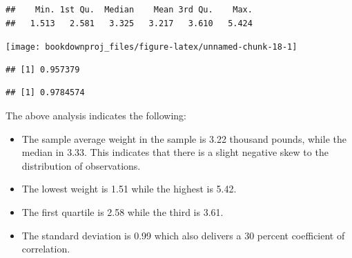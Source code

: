 \documentclass[
]{book}
\newenvironment{Shaded}{\begin{snugshade}}{\end{snugshade}}
\newcommand{\AttributeTok}[1]{\textcolor[rgb]{0.77,0.63,0.00}{#1}}
\newcommand{\CommentTok}[1]{\textcolor[rgb]{0.56,0.35,0.01}{\textit{#1}}}
\newcommand{\DecValTok}[1]{\textcolor[rgb]{0.00,0.00,0.81}{#1}}
\newcommand{\DocumentationTok}[1]{\textcolor[rgb]{0.56,0.35,0.01}{\textbf{\textit{#1}}}}
\newcommand{\FunctionTok}[1]{\textcolor[rgb]{0.00,0.00,0.00}{#1}}
\newcommand{\NormalTok}[1]{#1}
\newcommand{\SpecialCharTok}[1]{\textcolor[rgb]{0.00,0.00,0.00}{#1}}
\newcommand{\StringTok}[1]{\textcolor[rgb]{0.31,0.60,0.02}{#1}}
\begin{document}
\begin{Shaded}
\end{Shaded}

\begin{verbatim}
##    Min. 1st Qu.  Median    Mean 3rd Qu.    Max. 
##   1.513   2.581   3.325   3.217   3.610   5.424
\end{verbatim}

\begin{Shaded}
\end{Shaded}

\begin{center}\texttt{[image: bookdownproj\_files/figure-latex/unnamed-chunk-18-1]} \end{center}

\begin{Shaded}
\end{Shaded}

\begin{verbatim}
## [1] 0.957379
\end{verbatim}

\begin{Shaded}
\end{Shaded}

\begin{verbatim}
## [1] 0.9784574
\end{verbatim}

The above analysis indicates the following:

\begin{itemize}
\item
  The sample average weight in the sample is 3.22 thousand pounds, while the median in 3.33. This indicates that there is a slight negative skew to the distribution of observations.
\item
  The lowest weight is 1.51 while the highest is 5.42.
\item
  The first quartile is 2.58 while the third is 3.61.
\item
  The standard deviation is 0.99 which also delivers a 30 percent coefficient of correlation.
\end{itemize}
\end{document}
